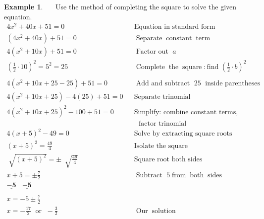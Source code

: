 \documentclass[12pt]{book}
\theoremstyle{definition}
\newtheorem{example}{Example}
\newcommand{\tmmathbf}[1]{\ensuremath{\boldsymbol{#1}}}
\newcommand{\tmop}[1]{\ensuremath{\operatorname{#1}}}
\begin{document}
\begin{example}~~~Use the method of completing the square to solve the given equation.
  \begin{eqnarray*}
    4 x^2 + 40 x + 51 = 0 &  & \text{Equation~in~standard~form}\\
    (4 x^2 + 40 x)+ 51=0 &  & \tmop{Separate} \tmop{constant} \tmop{term}\\
    4(x^2 + 10 x) + 51=0 &  & \tmop{Factor~out~} a\\
		\left( \frac{1}{2} \cdot 10 \right)^2 = 5^2 = 25 &  & \tmop{Complete}
    \tmop{the} \tmop{square} : \text{find~}\left( \frac{1}{2} \cdot b \right)^2\\
    &&\\
		4(x^2 + 10 x+25-25) +51=0 &  & \tmop{Add~and~subtract~} 25
    \tmop{~inside~parentheses}\\
    4(x^2 + 10 x+25)-4(25) +51=0 &  & \tmop{Separate~trinomial}\\
    4(x^2 + 10 x+25)^2 -100+51= 0 &  & \text{Simplify:~combine~constant~terms,}\\
		& & ~~~\text{factor~trinomial}\\
		4(x + 5)^2 -49= 0&&\tmop{Solve~by~extracting~square~roots}\\
		(x + 5)^2= \frac{49}{4}&&\tmop{Isolate~the~square}\\
		\sqrt[]{(x + 5)^2} = \pm~ \sqrt[]{\frac{49}{4}} &  & \tmop{Square~root~both~sides}\\
		x + 5 = \pm \frac{7}{2} &  & \tmop{Subtract~} 5 \tmop{from} \tmop{both}
    \tmop{sides}\\
    \tmmathbf{\underline{- 5}~~~~\underline{- 5}}  &  & \\
    &&\\
		x = - 5 \pm \frac{7}{2} &  &\\
		x = -\frac{17}{2} \tmop{~or~} -\frac{3}{2} &  & \tmop{Our} \tmop{solution}
  \end{eqnarray*}
\end{example}
\end{document}
